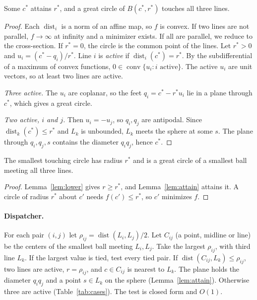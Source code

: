 \documentclass[10pt]{hackr26}
\newcommand{\dist}{\operatorname{dist}}
\begin{document}
\begin{lemma}[Attainment]\label{lem:attain}
Some $c^*$ attains $r^*$, and a great circle of $B(c^*,r^*)$ touches all three lines.
\end{lemma}
\begin{proof}
Each $\dist_i$ is a norm of an affine map, so $f$ is convex.
If two lines are not parallel, $f\to\infty$ at infinity and a minimizer exists. If all are parallel, we reduce to the cross-section.
If $r^*=0$, the circle is the common point of the lines.
Let $r^*>0$ and $u_i=(c^*-q_i)/r^*$.
Line $i$ is \emph{active} if $\dist_i(c^*)=r^*$.
By the subdifferential of a maximum of convex functions, $0\in\operatorname{conv}\{u_i: i\text{ active}\}$.
The active $u_i$ are unit vectors, so at least two lines are active.

\emph{Three active.} The $u_i$ are coplanar, so the feet $q_i=c^*-r^*u_i$ lie in a plane through $c^*$, which gives a great circle.

\emph{Two active, $i$ and $j$.} Then $u_i=-u_j$, so $q_i,q_j$ are antipodal.
Since $\dist_k(c^*)\le r^*$ and $L_k$ is unbounded, $L_k$ meets the sphere at some $s$.
The plane through $q_i,q_j,s$ contains the diameter $q_iq_j$, hence $c^*$.
\end{proof}

\begin{theorem}\label{thm:main}
The smallest touching circle has radius $r^*$ and is a great circle of a smallest ball meeting all three lines.
\end{theorem}
\begin{proof}
Lemma~\ref{lem:lower} gives $r\ge r^*$, and Lemma~\ref{lem:attain} attains it.
A circle of radius $r^*$ about $c'$ needs $f(c')\le r^*$, so $c'$ minimizes $f$.
\end{proof}


\paragraph{Dispatcher.}
For each pair $(i,j)$ let $\rho_{ij}=\dist(L_i,L_j)/2$.
Let $C_{ij}$ (a point, midline or line) be the centers of the smallest ball meeting $L_i,L_j$.
Take the largest $\rho_{ij}$, with third line $L_k$.
If the largest value is tied, test every tied pair.
If $\dist(C_{ij},L_k)\le\rho_{ij}$, two lines are active, $r=\rho_{ij}$, and $c\in C_{ij}$ is nearest to $L_k$.
The plane holds the diameter $q_iq_j$ and a point $s\in L_k$ on the sphere (Lemma~\ref{lem:attain}).
Otherwise three are active (Table~\ref{tab:cases}).
The test is closed form and $O(1)$.
\end{document}
